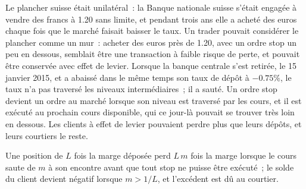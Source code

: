 \begin{omfigure}

\label{fig:m2:emerging-market-fx-and-ndfs:eurchf}
\end{omfigure}

Le plancher suisse était unilatéral~: la Banque nationale suisse s'était engagée à vendre des francs
à 1.20 sans limite, et pendant trois ans elle a acheté des euros chaque fois que le marché faisait
baisser le taux. Un trader pouvait considérer le plancher comme un mur~: acheter des euros
près de 1.20, avec un ordre stop un peu en dessous, semblait être une transaction à faible
risque de perte, et pouvait être conservée avec effet de levier. Lorsque la banque centrale
s'est retirée, le 15 janvier 2015, et a abaissé dans le même temps son taux de dépôt à $-0.75\%$, le taux
n'a pas traversé les niveaux intermédiaires~; il a sauté. Un ordre stop devient un ordre au marché
lorsque son niveau est traversé par les cours, et il est exécuté au prochain cours disponible, qui
ce jour-là pouvait se trouver très loin en dessous. Les clients à effet de levier pouvaient perdre
plus que leurs dépôts, et leurs courtiers le reste.

\begin{proposition}\label{prop:m2:emerging-market-fx-and-ndfs:leverage}
Une position de $L$ fois la marge déposée perd $L\,m$ fois la marge lorsque le cours saute de $m$
à son encontre avant que tout stop ne puisse être exécuté~; le solde du client
devient négatif lorsque $m > 1/L$, et l'excédent est dû au courtier.
\end{proposition}

